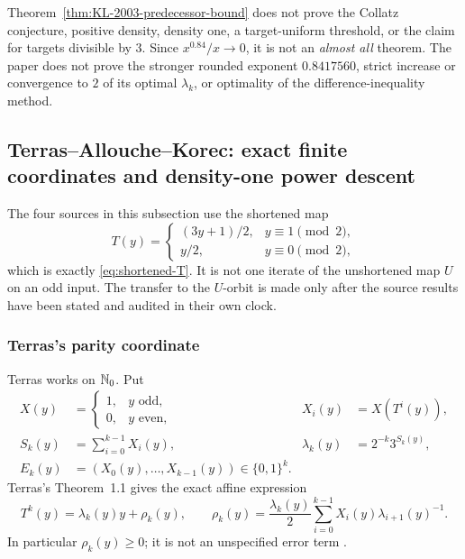 \begin{nonclaim}
Theorem~\ref{thm:KL-2003-predecessor-bound} does not prove the Collatz
conjecture, positive density, density one, a target-uniform threshold, or the
claim for targets divisible by \(3\).  Since \(x^{0.84}/x\to0\), it is not an
\emph{almost all} theorem.  The paper does not prove the stronger rounded
exponent \(0.8417560\), strict increase or convergence to \(2\) of its
optimal \(\lambda_k\), or optimality of the difference-inequality method.
\end{nonclaim}

\subsection{Terras--Allouche--Korec: exact finite coordinates and
density-one power descent}
\label{subsec:Terras-Allouche-Korec-density}

The four sources in this subsection use the shortened map
\[
 T(y)=
 \begin{cases}
  (3y+1)/2,&y\equiv1\pmod2,\\
  y/2,&y\equiv0\pmod2,
 \end{cases}
\]
which is exactly \eqref{eq:shortened-T}.  It is not one iterate of the
unshortened map \(U\) on an odd input.  The transfer to the \(U\)-orbit is
made only after the source results have been stated and audited in their own
clock.

\subsubsection{Terras's parity coordinate}

Terras works on \(\mathbb{N}_{0}\).  Put
\begin{align}
 X(y)&=
 \begin{cases}1,&y\text{ odd},\\0,&y\text{ even},\end{cases}
 &
 X_i(y)&=X(T^i(y)),                                      \label{eq:Terras-X}\\
 S_k(y)&=\sum_{i=0}^{k-1}X_i(y),
 &
 \lambda_k(y)&=2^{-k}3^{S_k(y)},                         \label{eq:Terras-lambda}\\
 E_k(y)&=(X_0(y),\ldots,X_{k-1}(y))\in\{0,1\}^k.         \label{eq:Terras-E}
\end{align}
Terras's Theorem~1.1 gives the exact affine expression
\begin{equation}
\label{eq:Terras-affine}
 T^k(y)=\lambda_k(y)y+\rho_k(y),
\qquad
 \rho_k(y)=\frac{\lambda_k(y)}2
 \sum_{i=0}^{k-1}X_i(y)\lambda_{i+1}(y)^{-1}.
\end{equation}
In particular \(\rho_k(y)\ge0\); it is not an unspecified error term
\cite[pp.~241--242, Thm.~1.1]{Terras1976}.

